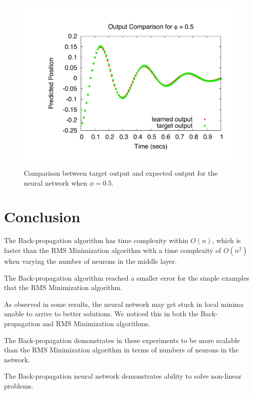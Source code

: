\documentclass[11pt]{article}
\begin{document}
\begin{figure}[htbp]
	\centering
		\includegraphics[width=0.85\columnwidth]{../bpgt-3.0/damping_test/output_phi.pdf}
	\caption{Comparison between target output and expected output for the neural network when $\phi=0.5$.}
	\label{fig:bpgt-3.0_damping_test_output_phi}
\end{figure}




\section{Conclusion} %
\label{sec:conclusion}

The Back-propagation algorithm has time complexity within $O(n)$, which is faster than the RMS Minimization algorithm with a time
complexity of $O(n^{2})$ when varying the number of neurons in the middle layer. 

The Back-propagation algorithm reached a smaller error for the simple examples that the RMS Minimization algorithm.

As observed in some results, the neural network may get stuck in local minima unable to arrive to better solutions. We noticed this in
both the Back-propagation and RMS Minimization algorithms.

The Back-propagation demonstrates in these experiments to be more scalable than the RMS Minimization algorithm in terms of numbers of
neurons in the network. 

The Back-propagation neural network demonstrates ability to solve non-linear problems.



\end{document}
